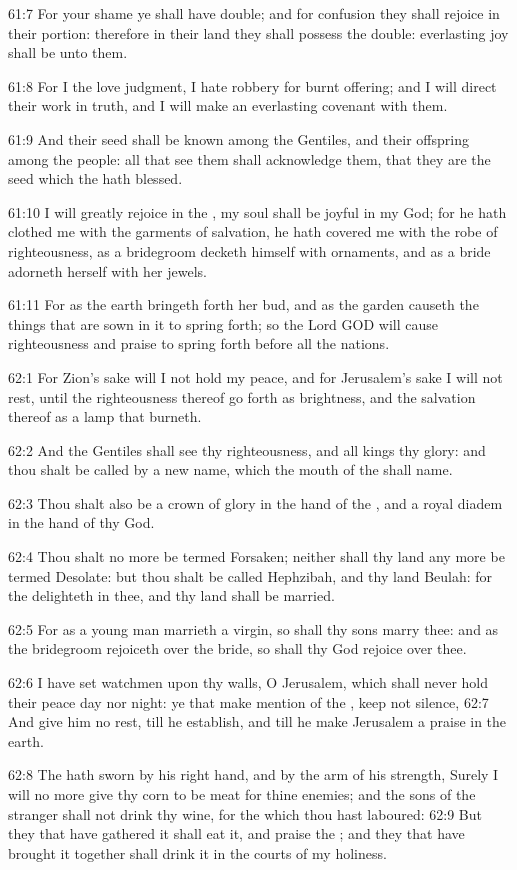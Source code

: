 61:7 For your shame ye shall have double; and for confusion they shall rejoice in their portion: therefore in their land they shall possess the double: everlasting joy shall be unto them.

61:8 For I the \LORD love judgment, I hate robbery for burnt offering; and I will direct their work in truth, and I will make an everlasting covenant with them.

61:9 And their seed shall be known among the Gentiles, and their offspring among the people: all that see them shall acknowledge them, that they are the seed which the \LORD hath blessed.

61:10 I will greatly rejoice in the \LORD, my soul shall be joyful in my God; for he hath clothed me with the garments of salvation, he hath covered me with the robe of righteousness, as a bridegroom decketh himself with ornaments, and as a bride adorneth herself with her jewels.

61:11 For as the earth bringeth forth her bud, and as the garden causeth the things that are sown in it to spring forth; so the Lord GOD will cause righteousness and praise to spring forth before all the nations.

62:1 For Zion's sake will I not hold my peace, and for Jerusalem's sake I will not rest, until the righteousness thereof go forth as brightness, and the salvation thereof as a lamp that burneth.

62:2 And the Gentiles shall see thy righteousness, and all kings thy glory: and thou shalt be called by a new name, which the mouth of the \LORD shall name.

62:3 Thou shalt also be a crown of glory in the hand of the \LORD, and a royal diadem in the hand of thy God.

62:4 Thou shalt no more be termed Forsaken; neither shall thy land any more be termed Desolate: but thou shalt be called Hephzibah, and thy land Beulah: for the \LORD delighteth in thee, and thy land shall be married.

62:5 For as a young man marrieth a virgin, so shall thy sons marry thee: and as the bridegroom rejoiceth over the bride, so shall thy God rejoice over thee.

62:6 I have set watchmen upon thy walls, O Jerusalem, which shall never hold their peace day nor night: ye that make mention of the \LORD, keep not silence, 62:7 And give him no rest, till he establish, and till he make Jerusalem a praise in the earth.

62:8 The \LORD hath sworn by his right hand, and by the arm of his strength, Surely I will no more give thy corn to be meat for thine enemies; and the sons of the stranger shall not drink thy wine, for the which thou hast laboured: 62:9 But they that have gathered it shall eat it, and praise the \LORD; and they that have brought it together shall drink it in the courts of my holiness.

